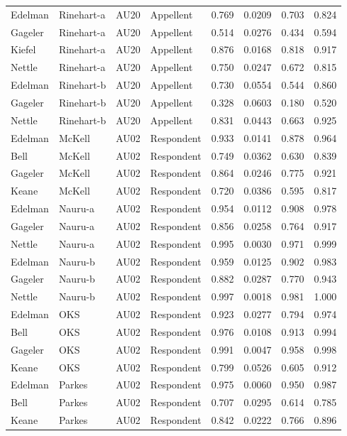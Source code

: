 \documentclass{monashthesis}
\begin{document}
\begin{center}
\begin{longtable}{llllllll}
Edelman & Rinehart-a & AU20 & Appellent & 0.769 & 0.0209 & 0.703 & 0.824 \\
Gageler & Rinehart-a & AU20 & Appellent & 0.514 & 0.0276 & 0.434 & 0.594 \\
Kiefel & Rinehart-a & AU20 & Appellent & 0.876 & 0.0168 & 0.818 & 0.917 \\
Nettle & Rinehart-a & AU20 & Appellent & 0.750 & 0.0247 & 0.672 & 0.815 \\
Edelman & Rinehart-b & AU20 & Appellent & 0.730 & 0.0554 & 0.544 & 0.860 \\
Gageler & Rinehart-b & AU20 & Appellent & 0.328 & 0.0603 & 0.180 & 0.520 \\
Nettle & Rinehart-b & AU20 & Appellent & 0.831 & 0.0443 & 0.663 & 0.925 \\
Edelman & McKell & AU02 & Respondent & 0.933 & 0.0141 & 0.878 & 0.964 \\
Bell & McKell & AU02 & Respondent & 0.749 & 0.0362 & 0.630 & 0.839 \\
Gageler & McKell & AU02 & Respondent & 0.864 & 0.0246 & 0.775 & 0.921 \\
Keane & McKell & AU02 & Respondent & 0.720 & 0.0386 & 0.595 & 0.817 \\
Edelman & Nauru-a & AU02 & Respondent & 0.954 & 0.0112 & 0.908 & 0.978 \\
Gageler & Nauru-a & AU02 & Respondent & 0.856 & 0.0258 & 0.764 & 0.917 \\
Nettle & Nauru-a & AU02 & Respondent & 0.995 & 0.0030 & 0.971 & 0.999 \\
Edelman & Nauru-b & AU02 & Respondent & 0.959 & 0.0125 & 0.902 & 0.983 \\
Gageler & Nauru-b & AU02 & Respondent & 0.882 & 0.0287 & 0.770 & 0.943 \\
Nettle & Nauru-b & AU02 & Respondent & 0.997 & 0.0018 & 0.981 & 1.000 \\
Edelman & OKS & AU02 & Respondent & 0.923 & 0.0277 & 0.794 & 0.974 \\
Bell & OKS & AU02 & Respondent & 0.976 & 0.0108 & 0.913 & 0.994 \\
Gageler & OKS & AU02 & Respondent & 0.991 & 0.0047 & 0.958 & 0.998 \\
Keane & OKS & AU02 & Respondent & 0.799 & 0.0526 & 0.605 & 0.912 \\
Edelman & Parkes & AU02 & Respondent & 0.975 & 0.0060 & 0.950 & 0.987 \\
Bell & Parkes & AU02 & Respondent & 0.707 & 0.0295 & 0.614 & 0.785 \\
Keane & Parkes & AU02 & Respondent & 0.842 & 0.0222 & 0.766 & 0.896 \\

\end{longtable}
\end{center}
\end{document}
